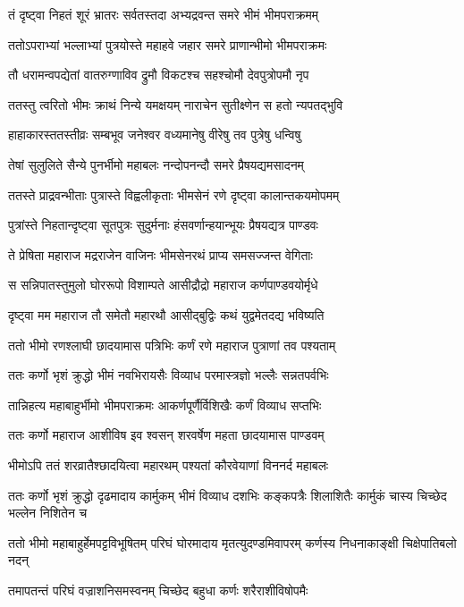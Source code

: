 \twolineshloka
{तं दृष्ट्वा निहतं शूरं भ्रातरः सर्वतस्तदा}
{अभ्यद्रवन्त समरे भीमं भीमपराक्रमम्}


\twolineshloka
{ततोऽपराभ्यां भल्लाभ्यां पुत्रयोस्ते महाहवे}
{जहार समरे प्राणान्भीमो भीमपराक्रमः}


\twolineshloka
{तौ धरामन्वपद्येतां वातरुग्णाविव द्रुमौ}
{विकटश्च सहश्चोमौ देवपुत्रोपमौ नृप}


\twolineshloka
{ततस्तु त्वरितो भीमः क्राथं निन्ये यमक्षयम्}
{नाराचेन सुतीक्ष्णेन स हतो न्यपतद्भुवि}


\twolineshloka
{हाहाकारस्ततस्तीव्रः सम्बभूव जनेश्वर}
{वध्यमानेषु वीरेषु तव पुत्रेषु धन्विषु}


\twolineshloka
{तेषां सुलुलिते सैन्ये पुनर्भीमो महाबलः}
{नन्दोपनन्दौ समरे प्रैषयद्यमसादनम्}


\twolineshloka
{ततस्ते प्राद्रवन्भीताः पुत्रास्ते विह्वलीकृताः}
{भीमसेनं रणे दृष्ट्वा कालान्तकयमोपमम्}


\twolineshloka
{पुत्रांस्ते निहतान्दृष्ट्वा सूतपुत्रः सुदुर्मनाः}
{हंसवर्णान्हयान्भूयः प्रैषयद्यत्र पाण्डवः}


\twolineshloka
{ते प्रेषिता महाराज मद्रराजेन वाजिनः}
{भीमसेनरथं प्राप्य समसज्जन्त वेगिताः}


\twolineshloka
{स सन्निपातस्तुमुलो घोररूपो विशाम्पते}
{आसीद्रौद्रो महाराज कर्णपाण्डवयोर्मृधे}


\twolineshloka
{दृष्ट्वा मम महाराज तौ समेतौ महारथौ}
{आसीद्बुद्विः कथं युद्वमेतदद्य भविष्यति}


\twolineshloka
{ततो भीमो रणश्लाघी छादयामास पत्रिभिः}
{कर्णं रणे महाराज पुत्राणां तव पश्यताम्}


\twolineshloka
{ततः कर्णो भृशं क्रुद्धो भीमं नवभिरायसैः}
{विव्याध परमास्त्रज्ञो भल्लैः सन्नतपर्वभिः}


\twolineshloka
{तान्निहत्य महाबाहुर्भीमो भीमपराक्रमः}
{आकर्णपूर्णैर्विशिखैः कर्णं विव्याध सप्तभिः}


\twolineshloka
{ततः कर्णो महाराज आशीविष इव श्वसन्}
{शरवर्षेण महता छादयामास पाण्डवम्}


\twolineshloka
{भीमोऽपि ततं शरव्रातैश्छादयित्वा महारथम्}
{पश्यतां कौरवेयाणां विननर्द महाबलः}


\threelineshloka
{ततः कर्णो भृशं क्रुद्धो दृढमादाय कार्मुकम्}
{भीमं विव्याध दशभिः कङ्कपत्रैः शिलाशितैः}
{कार्मुकं चास्य चिच्छेद भल्लेन निशितेन च}


\threelineshloka
{ततो भीमो महाबाहुर्हेमपट्टविभूषितम्}
{परिघं घोरमादाय मृतत्युदण्डमिवापरम्}
{कर्णस्य निधनाकाङ्क्षी चिक्षेपातिबलो नदन्}


\twolineshloka
{तमापतन्तं परिघं वज्राशनिसमस्वनम्}
{चिच्छेद बहुधा कर्णः शरैराशीविषोपमैः}


